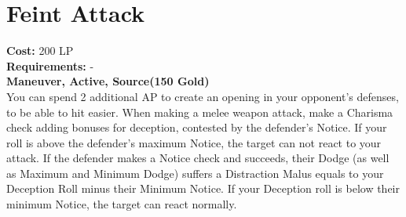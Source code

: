\section{Feint Attack}\label{maneuver:feintAttack}
\textbf{Cost:} 200 LP\\
\textbf{Requirements:} -\\
\textbf{Maneuver, Active, Source(150 Gold)}\\
You can spend 2 additional AP to create an opening in your opponent's defenses, to be able to hit easier.
When making a melee weapon attack, make a Charisma check adding bonuses for deception, contested by the defender's Notice.
If your roll is above the defender's maximum Notice, the target can not react to your attack.
If the defender makes a Notice check and succeeds, their Dodge (as well as Maximum and Minimum Dodge) suffers a Distraction Malus equals to your Deception Roll minus their Minimum Notice.
If your Deception roll is below their minimum Notice, the target can react normally.\\